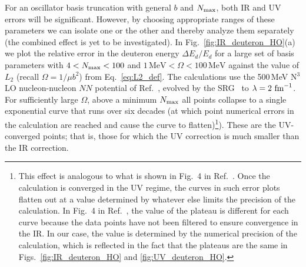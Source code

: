 	For an oscillator basis truncation with general $b$ and ${N_{\mathrm{max}}}$, both
	IR and UV errors will be significant.  However, by choosing
	appropriate ranges of these parameters we can isolate one or the other
	and thereby analyze them separately (the combined effect is yet to be
	investigated).  In Fig.~\ref{fig:IR_deuteron_HO}(a) we
	plot the relative error in the deuteron energy $\Delta E_d/E_d$ for a
	large set of basis parameters with $4 < {N_{\mathrm{max}}} < 100$ and
	$1\,\mbox{MeV} < \Omega < 100\,\mbox{MeV}$ against the value of $L_2$
	(recall $\Omega = 1/\mu b^2$) from Eq.~\eqref{eq:L2_def}.  The
	calculations use the 500\,MeV N$^3$LO nucleon-nucleon $NN$ potential
	of Ref.~\cite{Entem:2003ft}, evolved by the
	SRG~\cite{Bogner:2006pc} to
	$\lambda = 2\,\,\text{fm}^{-1}$.  For sufficiently large $\Omega$, above a minimum
	${N_{\mathrm{max}}}$ all points collapse to a single exponential curve that runs
	over six decades (at which point numerical errors in the calculation
	are reached and cause the curve to flatten)\footnote{This effect is analogous
	to what is shown in Fig.~4 in Ref.~\cite{Coon:2012ab}.  Once the calculation
	is converged in the UV regime, the curves in such error plots flatten out at
	a value determined by whatever else limits the precision of the calculation.
	In Fig.~4 in Ref.~\cite{Coon:2012ab}, the value of the plateau is different
	for each curve because the data points have not been filtered to ensure
	convergence in the IR.  In our case, the value is determined by the numerical
	precision	of the calculation, which is reflected in the fact that the
	plateaus are the same in Figs.~\ref{fig:IR_deuteron_HO} and
	\ref{fig:UV_deuteron_HO}.}). 	These are the UV-converged points; that is,
	those for which the UV correction	is much smaller than the IR correction.

